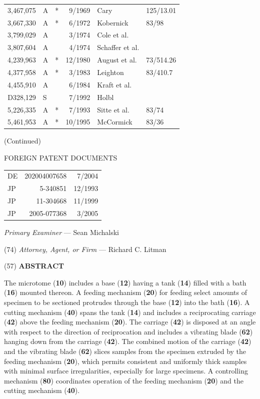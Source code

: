 \documentclass{article}
\begin{document}
\noindent
\begin{tabular}{@{}rlcrll@{}}
3,467,075 & A & * & 9/1969 & Cary & 125/13.01\\
3,667,330 & A & * & 6/1972 & Kobernick & 83/98\\
3,799,029 & A &  & 3/1974 & Cole et al. & \\
3,807,604 & A &  & 4/1974 & Schaffer et al. & \\
4,239,963 & A & * & 12/1980 & August et al. & 73/514.26\\
4,377,958 & A & * & 3/1983 & Leighton & 83/410.7\\
4,455,910 & A &  & 6/1984 & Kraft et al. & \\
D328,129 & S &  & 7/1992 & Holbl & \\
5,226,335 & A & * & 7/1993 & Sitte et al. & 83/74\\
5,461,953 & A & * & 10/1995 & McCormick & 83/36\\
\end{tabular}
\begin{center}(Continued)\end{center}
\begin{center}FOREIGN PATENT DOCUMENTS\end{center}
\noindent
\begin{tabular}{@{}lrr@{}}
DE & 202004007658 & 7/2004\\
JP & 5-340851 & 12/1993\\
JP & 11-304668 & 11/1999\\
JP & 2005-077368 & 3/2005\\
\end{tabular}

\noindent \textit{Primary Examiner} — Sean Michalski

\noindent (74) \textit{Attorney, Agent, or Firm} — Richard C. Litman

\noindent (57) \hfill \textbf{ABSTRACT} \hfill\mbox{}

The microtome (\textbf{10}) includes a base (\textbf{12}) having a tank (\textbf{14}) filled with a bath (\textbf{16}) mounted thereon. A feeding mechanism (\textbf{20}) for feeding select amounts of specimen to be sectioned protrudes through the base (\textbf{12}) into the bath (\textbf{16}). A cutting mechanism (\textbf{40}) spans the tank (\textbf{14}) and includes a reciprocating carriage (\textbf{42}) above the feeding mechanism (\textbf{20}). The carriage (\textbf{42}) is disposed at an angle with respect to the direction of reciprocation and includes a vibrating blade (\textbf{62}) hanging down from the carriage (\textbf{42}). The combined motion of the carriage (\textbf{42}) and the vibrating blade (\textbf{62}) slices samples from the specimen extruded by the feeding mechanism (\textbf{20}), which permits consistent and uniformly thick samples with minimal surface irregularities, especially for large specimens. A controlling mechanism (\textbf{80}) coordinates operation of the feeding mechanism (\textbf{20}) and the cutting mechanism (\textbf{40}).
\end{document}
